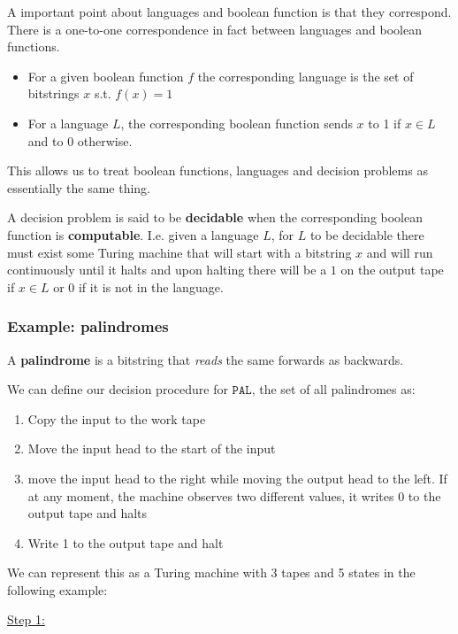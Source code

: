 \documentclass{article}
\begin{document}
A important point about languages and boolean function is that they correspond. There is a one-to-one correspondence in fact between languages and boolean functions.
\begin{itemize}
  \item For a given boolean function $f$ the corresponding language is the set of bitstrings $x$ s.t. $f(x) = 1$
  \item For a language $L$, the corresponding boolean function sends $x$ to 1 if $x \in L$ and to $0$ otherwise.
\end{itemize}

This allows us to treat boolean functions, languages and decision problems as essentially the same thing.

A decision problem is said to be \textbf{decidable} when the corresponding boolean function is \textbf{computable}. I.e. given a language $L$, for $L$ to be decidable there must exist some Turing machine that will start with a bitstring $x$ and will run continuously until it halts and upon halting there will be a $1$ on the output tape if $x \in L$ or $0$ if it is not in the language.

\subsubsection{Example: palindromes}

A \textbf{palindrome} is a bitstring that \textit{reads} the same forwards as backwards.

We can define our decision procedure for $\texttt{PAL} $, the set of all palindromes as:

\begin{enumerate}
  \item Copy the input to the work tape
  \item Move the input head to the start of the input
  \item move the input head to the right while moving the output head to the left. If at any moment, the machine observes two different values, it writes 0 to the output tape and halts
  \item Write 1 to the output tape and halt
\end{enumerate}

We can represent this as a Turing machine with 3 tapes and 5 states in the following example:

\underline{Step 1:}
\end{document}
